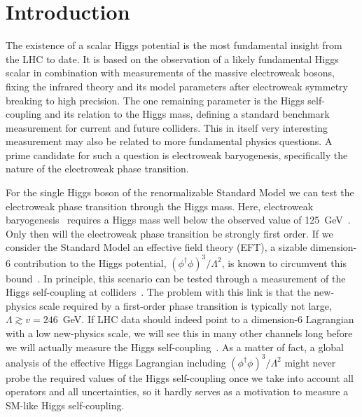 \documentclass[aps,prd,11pt,tightenlines,superscriptaddress,nofootinbib,preprintnumbers,notitlepage]{revtex4-1}
\begin{document}
\section{Introduction}
\label{sec:introduction}

The existence of a scalar Higgs potential is the most fundamental
insight from the LHC to date. It is based on the observation of a
likely fundamental Higgs scalar in combination with measurements of
the massive electroweak bosons, fixing the infrared theory and its
model parameters after electroweak symmetry breaking to high
precision. The one remaining parameter is the Higgs self-coupling and
its relation to the Higgs mass, defining a standard benchmark
measurement for current and future colliders.  
This in itself very interesting measurement may also be related 
to more fundamental physics questions. A prime candidate
for such a question is electroweak baryogenesis, specifically the
nature of the electroweak phase transition. 

For the single Higgs boson of the renormalizable Standard Model we can
test the electroweak phase transition through the Higgs mass.  Here,
electroweak baryogenesis~\cite{ew_phase,review_ew} requires a Higgs
mass well below the observed value of
125~GeV~\cite{misha_higgs,ew_higgs,Shaposhnikov:1991cu}. Only then will the electroweak
phase transition be strongly first order. 
If we consider the Standard
Model an effective field theory (EFT), a sizable dimension-6 contribution to the
Higgs potential, $(\phi^\dag \phi)^3/\Lambda^2$, is known to
circumvent this bound~\cite{eft1,eft2,Noble,christophe_geraldine}. 
In principle, this scenario
can be tested through a measurement of the Higgs self-coupling at
colliders~\cite{uli1,eft2,Noble,christophe_geraldine}. The problem with this link is that the 
new-physics scale
required by a first-order phase transition is typically
not large, $\Lambda \gtrsim v = 246$~GeV. If LHC data should indeed
point to a dimension-6 Lagrangian with a low new-physics scale, we
will see this in many other channels long before we will actually
measure the Higgs self-coupling~\cite{legacy}.
As a matter of fact, a global analysis of the effective Higgs
Lagrangian including $(\phi^\dag \phi)^3/\Lambda^2$ might
never probe the required values of the Higgs self-coupling once we
take into account all operators and all uncertainties, so it hardly
serves as a motivation to measure a SM-like Higgs
self-coupling.\medskip
\end{document}
